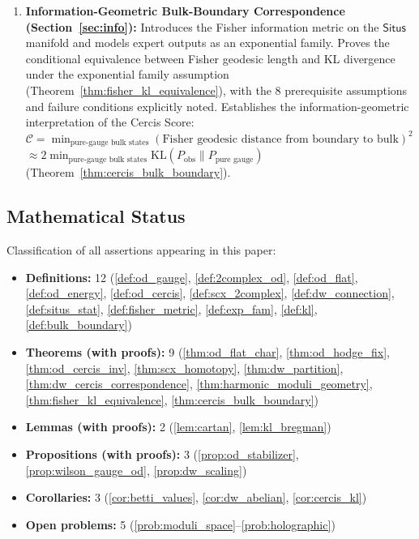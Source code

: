 \documentclass[12pt,a4paper]{article}
\theoremstyle{definition}
\theoremstyle{remark}
\theoremstyle{definition}
\newcommand{\cercis}{\mathcal{C}}
\newcommand{\Situs}{\textsf{Situs}}
\newcommand{\KL}{\mathrm{KL}}
\begin{document}
\begin{enumerate}[label=(\arabic*)]
    \item \textbf{Information-Geometric Bulk-Boundary Correspondence (Section~\ref{sec:info}):}
    Introduces the Fisher information metric on the $\Situs$ manifold and models expert outputs as an exponential family.
    Proves the conditional equivalence between Fisher geodesic length and KL divergence under the exponential family assumption (Theorem~\ref{thm:fisher_kl_equivalence}), with the 8 prerequisite assumptions and failure conditions explicitly noted.
    Establishes the information-geometric interpretation of the Cercis Score:
    $\cercis = \min_{\text{pure-gauge bulk states}} (\text{Fisher geodesic distance from boundary to bulk})^2$
    $\approx 2\min_{\text{pure-gauge bulk states}} \KL(P_{\text{obs}} \| P_{\text{pure gauge}})$
    (Theorem~\ref{thm:cercis_bulk_boundary}).
\end{enumerate}

\subsection{Mathematical Status}

Classification of all assertions appearing in this paper:
\begin{itemize}
    \item \textbf{Definitions:} 12 (\ref{def:od_gauge}, \ref{def:2complex_od}, \ref{def:od_flat}, \ref{def:od_energy}, \ref{def:od_cercis}, \ref{def:scx_2complex}, \ref{def:dw_connection}, \ref{def:situs_stat}, \ref{def:fisher_metric}, \ref{def:exp_fam}, \ref{def:kl}, \ref{def:bulk_boundary})
    \item \textbf{Theorems (with proofs):} 9 (\ref{thm:od_flat_char}, \ref{thm:od_hodge_fix}, \ref{thm:od_cercis_inv}, \ref{thm:scx_homotopy}, \ref{thm:dw_partition}, \ref{thm:dw_cercis_correspondence}, \ref{thm:harmonic_moduli_geometry}, \ref{thm:fisher_kl_equivalence}, \ref{thm:cercis_bulk_boundary})
    \item \textbf{Lemmas (with proofs):} 2 (\ref{lem:cartan}, \ref{lem:kl_bregman})
    \item \textbf{Propositions (with proofs):} 3 (\ref{prop:od_stabilizer}, \ref{prop:wilson_gauge_od}, \ref{prop:dw_scaling})
    \item \textbf{Corollaries:} 3 (\ref{cor:betti_values}, \ref{cor:dw_abelian}, \ref{cor:cercis_kl})
    \item \textbf{Open problems:} 5 (\ref{prob:moduli_space}--\ref{prob:holographic})
\end{itemize}
\end{document}
